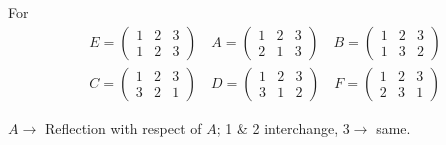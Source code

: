 \begin{example*}
For\quad {}
\begin{align*}
& E=\left(\begin{matrix} 1 & 2 & 3\\ 1 & 2 & 3\end{matrix}\right)\quad A=\left(\begin{matrix} 1 & 2 & 3\\ 2 & 1 & 3\end{matrix}\right)\quad B=\left(\begin{matrix} 1 & 2 & 3\\ 1 & 3 & 2\end{matrix}\right)\\[5pt]
& C=\left(\begin{matrix} 1 & 2 & 3\\ 3 & 2 & 1\end{matrix}\right)\quad D=\left(\begin{matrix} 1 & 2 & 3\\ 3 & 1 & 2\end{matrix}\right)\quad F=\left(\begin{matrix} 1 & 2 & 3\\ 2 & 3 & 1\end{matrix}\right)
\end{align*}

$A \to$ Reflection with respect of $A$; 1 \& 2 interchange, $3\to$ same.


\end{example*}
